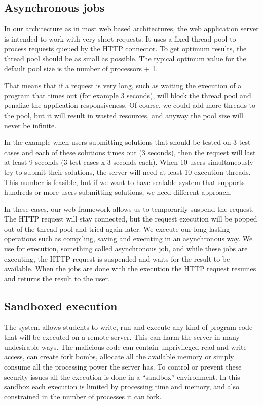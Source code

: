 \documentclass{article}
\begin{document}
\subsection{Asynchronous jobs}
In our architecture as in most web based architectures, the web application
server is intended to work with very short requests. It uses a fixed thread pool
to process requests queued by the HTTP connector. To get optimum results, the
thread pool should be as small as possible. The typical optimum value for the
default pool size is the number of processors + 1.

That means that if a request is very long, such as waiting the execution of a
program that times out (for example 3 seconds), will block the thread pool and
penalize the application responsiveness. Of course, we could add more threads to
the pool, but it will result in wasted resources, and anyway the pool size will
never be infinite.

In the example when users submitting solutions that should be tested on 3 test
cases and each of these solutions times out (3 seconds), then the request
will last at least 9 seconds (3 test cases x 3 seconds each). When 10 users
simultaneously try to submit their solutions, the server will need at least 10
execution threads. This number is feasible, but if we want to have scalable
system that supports hundreds or more users submitting solutions, we need
different approach.

In these cases, our web framework allows us to temporarily suspend the request. 
The HTTP request will stay connected, but the request execution will be popped
out of the thread pool and tried again later. We execute our long lasting
operations such as compiling, saving and executing in an asynchronous way. We
use for execution, something called asynchronous job, and while these jobs are
executing, the HTTP request is suspended and waits for the result to be
available. When the jobs are done with the execution the HTTP request resumes
and returns the result to the user.

\subsection{Sandboxed execution}
The system allows students to write, run and execute any kind of program code
that will be executed on a remote server. This can harm the server in many
undesirable ways. The malicious code can contain unprivileged read and write
access, can create fork bombs, allocate all the available memory or simply
consume all the processing power the server has. To control or prevent
these security issues all the execution is done in a ``sandbox'' environment. In
this sandbox each execution is limited by processing time and memory, and also
constrained in the number of processes it can fork.
\end{document}
